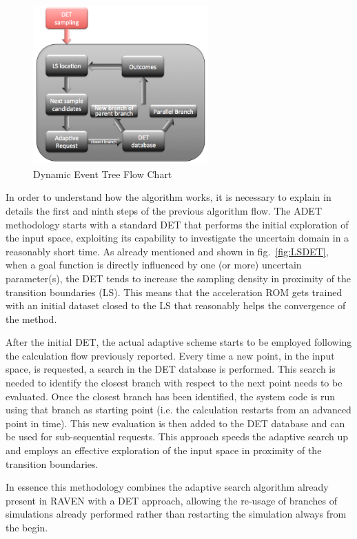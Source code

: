 \begin{figure}[h]
  \centering
     \includegraphics[width=0.6\textwidth]{figures/adaptiveFlowChart.png}
  \caption{Dynamic Event Tree Flow Chart}
  \label{fig:ADETflowChart}
\end{figure}

In order to understand how the algorithm works, it is necessary to explain in details the first and ninth steps of the previous algorithm flow. The ADET methodology starts with a standard DET that performs the initial exploration of the input space, exploiting its capability to investigate the uncertain domain in a reasonably short time. As already mentioned and shown in fig.~\ref{fig:LSDET}, when a goal function is directly influenced by one (or more) uncertain parameter(s), the DET tends to increase the sampling density in proximity of the transition boundaries (LS). This means that the acceleration ROM gets trained with an initial dataset closed to the LS that reasonably helps the convergence of the method. 

After the initial DET, the actual adaptive scheme starts to be employed following the calculation flow previously reported. Every time a new point, in the input space, is requested, a search in the DET database is performed. This search is needed to identify the closest branch with respect to the next point needs to be evaluated. Once the closest branch has been identified, the system code is run using that branch as starting point (i.e. the calculation restarts from an advanced point in time). This new evaluation is then added to the DET database and can be used for sub-sequential requests. This approach speeds the adaptive search up and employs an effective exploration of the input space in proximity of the transition boundaries.

In essence this methodology combines the adaptive search algorithm already present in RAVEN with a DET approach, allowing the re-usage of branches of simulations already performed rather than restarting the simulation always from the begin.



